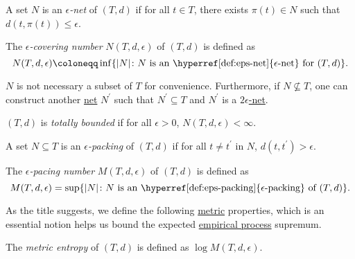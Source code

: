 \begin{definition}\label{def:eps-net}
	A set \(N\) is an \emph{\(\epsilon \)-net} of \((T, d)\) if for all \(t\in T\), there exists \(\pi (t) \in N\) such that \(d(t, \pi (t)) \leq \epsilon \).
\end{definition}

\begin{definition}\label{def:covering-number}
	The \emph{\(\epsilon \)-covering number} \(N(T, d, \epsilon )\) of \((T, d)\) is defined as
	\[
		N(T, d, \epsilon ) \coloneqq \inf \{ \vert N \vert \colon N \text{ is an \hyperref[def:eps-net]{\(\epsilon\)-net} for \((T, d)\)} \}.
	\]
\end{definition}

\begin{remark}
	\(N\) is not necessary a subset of \(T\) for convenience. Furthermore, if \(N \nsubseteq T\), one can construct another \hyperref[def:eps-net]{net} \(N^{\prime} \) such that \(N^{\prime} \subseteq T\) and \(N^{\prime} \) is a \hyperref[def:eps-net]{\(2 \epsilon\)-net}.
\end{remark}

\begin{definition}\label{def:totally-bounded}
	\((T, d)\) is \emph{totally bounded} if for all \(\epsilon > 0\), \(N(T, d, \epsilon ) < \infty \).
\end{definition}

\begin{definition}\label{def:eps-packing}
	A set \(N \subseteq T\) is an \emph{\(\epsilon \)-packing} of \((T, d)\) if for all \(t \neq t^{\prime} \) in \(N\), \(d(t, t^{\prime} ) > \epsilon \).
\end{definition}

\begin{definition}\label{def:packing-number}
	The \emph{\(\epsilon \)-pacing number} \(M(T, d, \epsilon )\) of \((T, d)\) is defined as
	\[
		M(T, d, \epsilon ) = \sup \{ \vert N \vert \colon N \text{ is an \hyperref[def:eps-packing]{\(\epsilon\)-packing} of \((T, d)\)}\}.
	\]
\end{definition}

As the title suggests, we define the following \hyperref[def:pseudo-metric]{metric} properties, which is an essential notion helps us bound the expected \hyperref[def:EP]{empirical process} supremum.

\begin{definition}\label{def:metric-entropy}
	The \emph{metric entropy} of \((T, d)\) is defined as \(\log M(T, d, \epsilon )\).
\end{definition}

